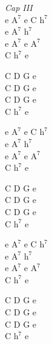 \begin{chordw}
    \textit{Cap III}\\
    e $\mathrm{A^7}$ e C $\mathrm{h^7}$\\
    e $\mathrm{A^7}$ $\mathrm{h^7}$\\
    e $\mathrm{A^7}$ e $\mathrm{A^7}$\\
    C $\mathrm{h^7}$ e

    C D G e\\
    C D G e\\
    C D G e\\
    C $\mathrm{h^7}$ e

    e $\mathrm{A^7}$ e C $\mathrm{h^7}$\\
    e $\mathrm{A^7}$ $\mathrm{h^7}$\\
    e $\mathrm{A^7}$ e $\mathrm{A^7}$\\
    C $\mathrm{h^7}$ e

    C D G e\\
    C D G e\\
    C D G e\\
    C $\mathrm{h^7}$ e

    e $\mathrm{A^7}$ e C $\mathrm{h^7}$\\
    e $\mathrm{A^7}$ $\mathrm{h^7}$\\
    e $\mathrm{A^7}$ e $\mathrm{A^7}$\\
    C $\mathrm{h^7}$ e

    C D G e\\
    C D G e\\
    C D G e\\
    C $\mathrm{h^7}$ e
\end{chordw}
